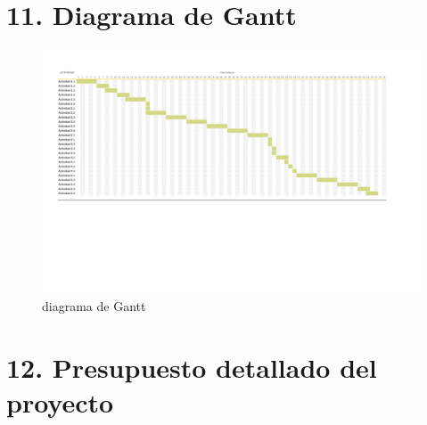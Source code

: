 \documentclass[
11pt, %
codirector, %
]{charter}
\begin{document}
\begin{landscape}
	\label{sec:gantt}
	\section{11. Diagrama de Gantt}
	\begin{figure}[htpb]
		\centering
		\includegraphics[width=1.28\textheight]{./Figuras/Gantt.pdf}
		\caption{diagrama de Gantt}
		\label{fig:diagGantt}
	\end{figure}

\end{landscape}




\section{12. Presupuesto detallado del proyecto}
\label{sec:presupuesto}
\end{document}
